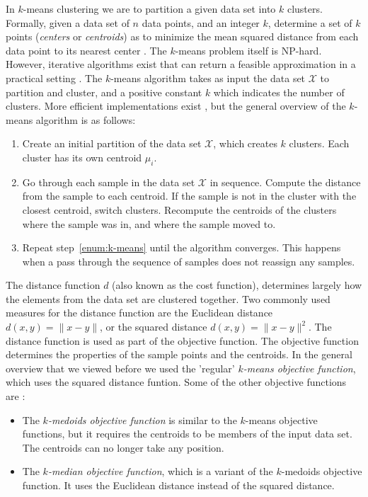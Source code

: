 \documentclass[../main.tex]{subfiles}
\begin{document}
In $k$-means clustering we are to partition a given data set into $k$ clusters.
Formally, given a data set of $n$ data points, and an integer $k$,
determine a set of $k$ points (\emph{centers} or \emph{centroids}) as to minimize the mean squared distance from each data point to its nearest center \cite{Kanungo2002}.
The $k$-means problem itself is NP-hard.
However, iterative algorithms exist that can return a feasible approximation in a practical setting \cite[Chapter~22]{Shalev2014understanding}.
The $k$-means algorithm takes as input the data set $\mathcal{X}$ to partition and cluster,
and a positive constant $k$ which indicates the number of clusters.
More efficient implementations exist \cite{Kanungo2002}, but the general overview of the $k$-means algorithm is as follows:
\begin{enumerate}[noitemsep]
    \item Create an initial partition of the data set $\mathcal{X}$, which creates $k$ clusters.
          Each cluster has its own centroid $\mu_{i}$.
    \item \label{enum:k-means}
          Go through each sample in the data set $\mathcal{X}$ in sequence.
          Compute the distance from the sample to each centroid.
          If the sample is not in the cluster with the closest centroid, switch clusters.
          Recompute the centroids of the clusters where the sample was in, and where the sample moved to.
    \item Repeat step~\ref{enum:k-means} until the algorithm converges.
          This happens when a pass through the sequence of samples does not reassign any samples.
\end{enumerate}


The distance function $d$ (also known as the cost function), determines largely how the elements from the data set are clustered together.
Two commonly used measures for the distance function are the Euclidean distance $d(x, y) = \| x - y \|$,
or the squared distance $d(x, y) = \| x - y \|^{2}$.
The distance function is used as part of the objective function.
The objective function determines the properties of the sample points and the centroids.
In the general overview that we viewed before we used the 'regular' \emph{$k$-means objective function},
which uses the squared distance funtion.
Some of the other objective functions are \cite[Chapter~22]{Shalev2014understanding}:
\begin{itemize}[noitemsep]
    \item The \emph{$k$-medoids objective function} is similar to the $k$-means objective functions,
          but it requires the centroids to be members of the input data set.
          The centroids can no longer take any position.
    \item The \emph{$k$-median objective function}, which is a variant of the $k$-medoids objective function.
          It uses the Euclidean distance instead of the squared distance.
\end{itemize}
\end{document}
